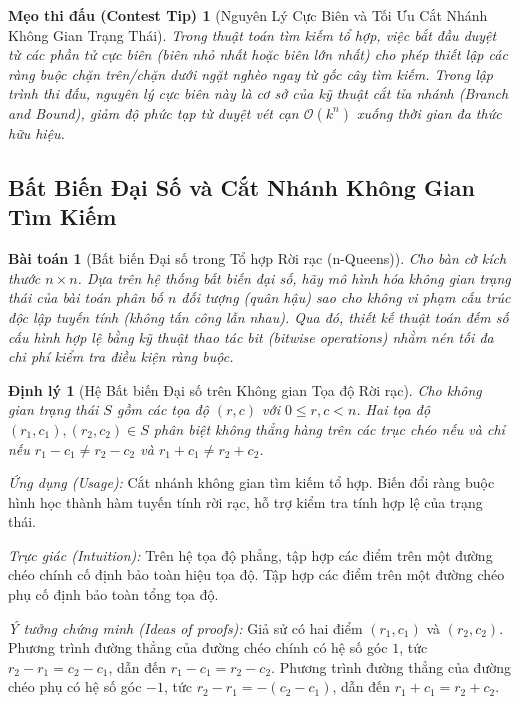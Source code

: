 \documentclass{article}
\newtheorem{baitoan}{Bài toán}
\newtheorem{dinhly}{Định lý}
\newtheorem{tip}{Mẹo thi đấu (Contest Tip)}
\begin{document}
\begin{tip}[Nguyên Lý Cực Biên và Tối Ưu Cắt Nhánh Không Gian Trạng Thái]
Trong thuật toán tìm kiếm tổ hợp, việc bắt đầu duyệt từ các phần tử cực biên (biên nhỏ nhất hoặc biên lớn nhất) cho phép thiết lập các ràng buộc chặn trên/chặn dưới ngặt nghèo ngay từ gốc cây tìm kiếm. Trong lập trình thi đấu, nguyên lý cực biên này là cơ sở của kỹ thuật cắt tỉa nhánh (Branch and Bound), giảm độ phức tạp từ duyệt vét cạn $\mathcal{O}(k^n)$ xuống thời gian đa thức hữu hiệu.
\end{tip}

\subsection{Bất Biến Đại Số và Cắt Nhánh Không Gian Tìm Kiếm}

\begin{baitoan}[Bất biến Đại số trong Tổ hợp Rời rạc (n-Queens)]
Cho bàn cờ kích thước $n \times n$. Dựa trên hệ thống bất biến đại số, hãy mô hình hóa không gian trạng thái của bài toán phân bố $n$ đối tượng (quân hậu) sao cho không vi phạm cấu trúc độc lập tuyến tính (không tấn công lẫn nhau). Qua đó, thiết kế thuật toán đếm số cấu hình hợp lệ bằng kỹ thuật thao tác bit (bitwise operations) nhằm nén tối đa chi phí kiểm tra điều kiện ràng buộc.
\end{baitoan}

\begin{dinhly}[Hệ Bất biến Đại số trên Không gian Tọa độ Rời rạc]
Cho không gian trạng thái $S$ gồm các tọa độ $(r, c)$ với $0 \le r, c < n$. Hai tọa độ $(r_1, c_1), (r_2, c_2) \in S$ phân biệt không thẳng hàng trên các trục chéo nếu và chỉ nếu $r_1 - c_1 \neq r_2 - c_2$ và $r_1 + c_1 \neq r_2 + c_2$.
\end{dinhly}

\emph{Ứng dụng (Usage):}
Cắt nhánh không gian tìm kiếm tổ hợp. Biến đổi ràng buộc hình học thành hàm tuyến tính rời rạc, hỗ trợ kiểm tra tính hợp lệ của trạng thái.

\emph{Trực giác (Intuition):}
Trên hệ tọa độ phẳng, tập hợp các điểm trên một đường chéo chính cố định bảo toàn hiệu tọa độ. Tập hợp các điểm trên một đường chéo phụ cố định bảo toàn tổng tọa độ.

\emph{Ý tưởng chứng minh (Ideas of proofs):}
Giả sử có hai điểm $(r_1, c_1)$ và $(r_2, c_2)$. Phương trình đường thẳng của đường chéo chính có hệ số góc $1$, tức $r_2 - r_1 = c_2 - c_1$, dẫn đến $r_1 - c_1 = r_2 - c_2$. Phương trình đường thẳng của đường chéo phụ có hệ số góc $-1$, tức $r_2 - r_1 = -(c_2 - c_1)$, dẫn đến $r_1 + c_1 = r_2 + c_2$.
\end{document}
